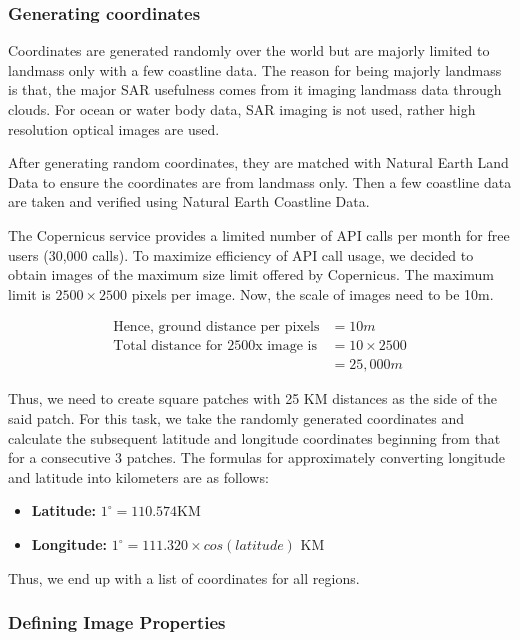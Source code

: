 \subsubsection{Generating coordinates}

Coordinates are generated randomly over the world but are majorly limited to landmass only with a few coastline data. The reason for being majorly landmass is that, the major SAR usefulness comes from it imaging landmass data through clouds. For ocean or water body data, SAR imaging is not used, rather high resolution optical images are used.

After generating random coordinates, they are matched with Natural Earth Land Data\cite{naturalearthland} to ensure the coordinates are from landmass only. Then a few coastline data are taken and verified using Natural Earth Coastline Data\cite{naturalearthcoast}.

The Copernicus service provides a limited number of API calls per month for free users (30,000 calls). To maximize efficiency of API call usage, we decided to obtain images of the maximum size limit offered by Copernicus. The maximum limit is $2500\times2500$ pixels per image. Now, the scale of images need to be 10m.

\begin{align*}
    \text{Hence, ground distance per pixels} &= 10m \\
    \text{Total distance for 2500x image is} &= 10\times2500 \\
    &= 25,000m
\end{align*}

Thus, we need to create square patches with 25 KM distances as the side of the said patch. For this task, we take the randomly generated coordinates and calculate the subsequent latitude and longitude coordinates beginning from that for a consecutive 3 patches. The formulas for approximately converting longitude and latitude into kilometers are as follows:

\begin{itemize}
    \item \textbf{Latitude: } $1^\circ = 110.574$KM
    \item \textbf{Longitude:} $1^\circ = 111.320\times cos(latitude)$ KM
\end{itemize}

Thus, we end up with a list of coordinates for all regions.

\subsubsection{Defining Image Properties}

